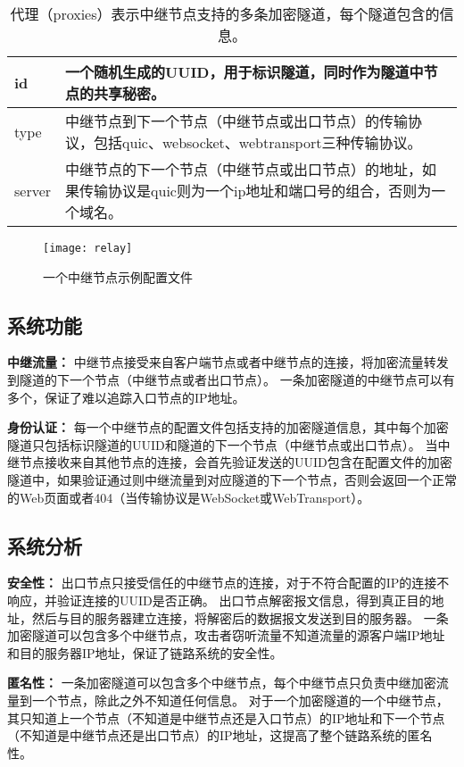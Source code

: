 \begin{table}[H]
  \begin{tabular}{| m{10em} | m{22em} |}
  \hline
  id & 一个随机生成的UUID，用于标识隧道，同时作为隧道中节点的共享秘密。  \\ \hline        
  type  & 中继节点到下一个节点（中继节点或出口节点）的传输协议，包括quic、websocket、webtransport三种传输协议。 \\ \hline    
  server  & 中继节点的下一个节点（中继节点或出口节点）的地址，如果传输协议是quic则为一个ip地址和端口号的组合，否则为一个域名。 \\ \hline              
  \end{tabular}
  \caption{代理（proxies）表示中继节点支持的多条加密隧道，每个隧道包含的信息。}
\end{table}

\begin{figure}[H]
  \centering
  \texttt{[image: relay]}
  \caption{一个中继节点示例配置文件}
\end{figure}

\subsection{系统功能}

\textbf{中继流量：}
中继节点接受来自客户端节点或者中继节点的连接，将加密流量转发到隧道的下一个节点（中继节点或者出口节点）。
一条加密隧道的中继节点可以有多个，保证了难以追踪入口节点的IP地址。

\textbf{身份认证：}
每一个中继节点的配置文件包括支持的加密隧道信息，其中每个加密隧道只包括标识隧道的UUID和隧道的下一个节点（中继节点或出口节点）。
当中继节点接收来自其他节点的连接，会首先验证发送的UUID包含在配置文件的加密隧道中，如果验证通过则中继流量到对应隧道的下一个节点，否则会返回一个正常的Web页面或者404（当传输协议是WebSocket或WebTransport）。

\subsection{系统分析}

\textbf{安全性：}
出口节点只接受信任的中继节点的连接，对于不符合配置的IP的连接不响应，并验证连接的UUID是否正确。
出口节点解密报文信息，得到真正目的地址，然后与目的服务器建立连接，将解密后的数据报文发送到目的服务器。
一条加密隧道可以包含多个中继节点，攻击者窃听流量不知道流量的源客户端IP地址和目的服务器IP地址，保证了链路系统的安全性。

\textbf{匿名性：}
一条加密隧道可以包含多个中继节点，每个中继节点只负责中继加密流量到一个节点，除此之外不知道任何信息。
对于一个加密隧道的一个中继节点，其只知道上一个节点（不知道是中继节点还是入口节点）的IP地址和下一个节点（不知道是中继节点还是出口节点）的IP地址，这提高了整个链路系统的匿名性。


